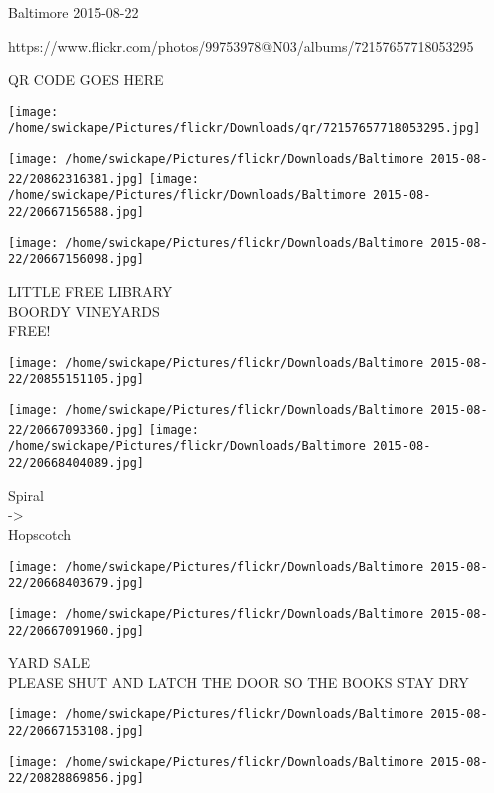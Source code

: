 \documentclass[10pt,letterpaper]{article}
\begin{document}
Baltimore 2015-08-22

https://www.flickr.com/photos/99753978@N03/albums/72157657718053295

QR CODE GOES HERE

\texttt{[image: /home/swickape/Pictures/flickr/Downloads/qr/72157657718053295.jpg]}
\pagebreak

\texttt{[image: /home/swickape/Pictures/flickr/Downloads/Baltimore 2015-08-22/20862316381.jpg]}
\texttt{[image: /home/swickape/Pictures/flickr/Downloads/Baltimore 2015-08-22/20667156588.jpg]}

\vspace{0.25in}
\texttt{[image: /home/swickape/Pictures/flickr/Downloads/Baltimore 2015-08-22/20667156098.jpg]}

LITTLE FREE LIBRARY\\
BOORDY VINEYARDS\\
FREE!\\
\pagebreak

\texttt{[image: /home/swickape/Pictures/flickr/Downloads/Baltimore 2015-08-22/20855151105.jpg]}

\vspace{0.25in}
\texttt{[image: /home/swickape/Pictures/flickr/Downloads/Baltimore 2015-08-22/20667093360.jpg]}
\texttt{[image: /home/swickape/Pictures/flickr/Downloads/Baltimore 2015-08-22/20668404089.jpg]}

Spiral\\
{-}>\\
Hopscotch\\
\pagebreak

\texttt{[image: /home/swickape/Pictures/flickr/Downloads/Baltimore 2015-08-22/20668403679.jpg]}

\vspace{0.25in}
\texttt{[image: /home/swickape/Pictures/flickr/Downloads/Baltimore 2015-08-22/20667091960.jpg]}

YARD SALE\\
PLEASE SHUT AND LATCH THE DOOR SO THE BOOKS STAY DRY\\
\pagebreak

\texttt{[image: /home/swickape/Pictures/flickr/Downloads/Baltimore 2015-08-22/20667153108.jpg]}

\vspace{0.25in}
\texttt{[image: /home/swickape/Pictures/flickr/Downloads/Baltimore 2015-08-22/20828869856.jpg]}
\end{document}
